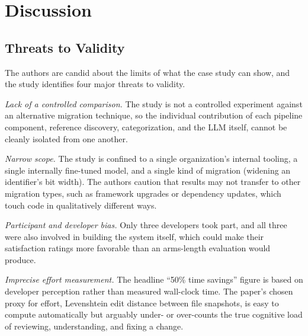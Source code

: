 \section{Discussion}

\subsection{Threats to Validity}
The authors are candid about the limits of what the case study can
show, and the study identifies four major threats to validity.

\emph{Lack of a controlled comparison.} The study is not a controlled
experiment against an alternative migration technique, so the
individual contribution of each pipeline component, reference
discovery, categorization, and the LLM itself, cannot be cleanly
isolated from one another.

\emph{Narrow scope.} The study is confined to a single organization's
internal tooling, a single internally fine-tuned model, and a single
kind of migration (widening an identifier's bit width). The authors
caution that results may not transfer to other migration types, such
as framework upgrades or dependency updates, which touch code in
qualitatively different ways.

\emph{Participant and developer bias.} Only three developers took
part, and all three were also involved in building the system itself,
which could make their satisfaction ratings more favorable than an
arms-length evaluation would produce.

\emph{Imprecise effort measurement.} The headline ``50\% time
savings'' figure is based on developer perception rather than measured
wall-clock time. The paper's chosen proxy for effort, Levenshtein edit
distance between file snapshots, is easy to compute automatically but
arguably under- or over-counts the true cognitive load of reviewing,
understanding, and fixing a change.

